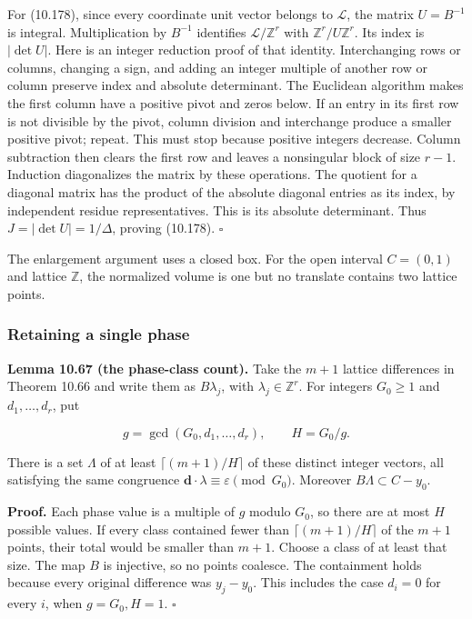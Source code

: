 \documentclass[
  11pt,
  a4paper,
]{article}
\begin{document}
For (10.178), since every coordinate unit vector belongs to
\(\mathcal L\), the matrix \(U=B^{-1}\) is integral. Multiplication by
\(B^{-1}\) identifies \(\mathcal L/\mathbb Z^r\) with
\(\mathbb Z^r/U\mathbb Z^r\). Its index is \(|\det U|\). Here is an
integer reduction proof of that identity. Interchanging rows or columns,
changing a sign, and adding an integer multiple of another row or column
preserve index and absolute determinant. The Euclidean algorithm makes
the first column have a positive pivot and zeros below. If an entry in
its first row is not divisible by the pivot, column division and
interchange produce a smaller positive pivot; repeat. This must stop
because positive integers decrease. Column subtraction then clears the
first row and leaves a nonsingular block of size \(r-1\). Induction
diagonalizes the matrix by these operations. The quotient for a diagonal
matrix has the product of the absolute diagonal entries as its index, by
independent residue representatives. This is its absolute determinant.
Thus \(J=|\det U|=1/\Delta\), proving (10.178). \(\square\)

The enlargement argument uses a closed box. For the open interval
\(C=(0,1)\) and lattice \(\mathbb Z\), the normalized volume is one but
no translate contains two lattice points.

\subsubsection{Retaining a single phase}\label{retaining-a-single-phase}

\textbf{Lemma 10.67 (the phase-class count).} Take the \(m+1\) lattice
differences in Theorem 10.66 and write them as \(B\lambda_j\), with
\(\lambda_j\in\mathbb Z^r\). For integers \(G_0\ge1\) and
\(d_1,\ldots,d_r\), put

\[
g=\gcd(G_0,d_1,\ldots,d_r),\qquad H=G_0/g.
\tag{10.179}
\]

There is a set \(\Lambda\) of at least \(\lceil(m+1)/H\rceil\) of these
distinct integer vectors, all satisfying the same congruence
\(\boldsymbol d\cdot\lambda\equiv\varepsilon\pmod{G_0}\). Moreover
\(B\Lambda\subset C-y_0\).

\textbf{Proof.} Each phase value is a multiple of \(g\) modulo \(G_0\),
so there are at most \(H\) possible values. If every class contained
fewer than \(\lceil(m+1)/H\rceil\) of the \(m+1\) points, their total
would be smaller than \(m+1\). Choose a class of at least that size. The
map \(B\) is injective, so no points coalesce. The containment holds
because every original difference was \(y_j-y_0\). This includes the
case \(d_i=0\) for every \(i\), when \(g=G_0,H=1\). \(\square\)
\end{document}
